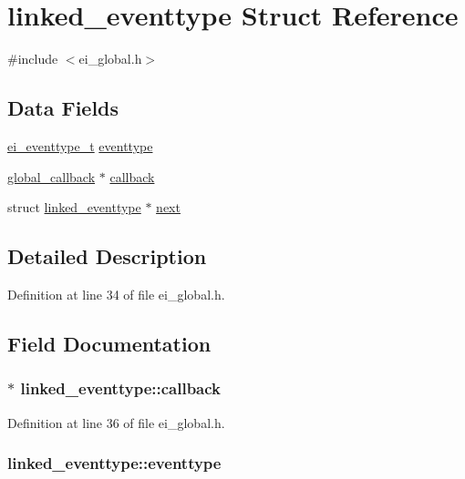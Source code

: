 \hypertarget{structlinked__eventtype}{
\section{linked\_\-eventtype Struct Reference}
\label{structlinked__eventtype}
}


{\ttfamily \#include $<$ei\_\-global.h$>$}\subsection*{Data Fields}
\begin{DoxyCompactItemize}
\item 
\hyperlink{ei__event_8h_a132dde064150d861ad24e9d839cbe007}{ei\_\-eventtype\_\-t} \hyperlink{structlinked__eventtype_a8557063644a1a542f2648834302e7547}{eventtype}
\item 
\hyperlink{structglobal__callback}{global\_\-callback} $\ast$ \hyperlink{structlinked__eventtype_a96eec2ebc0a8d13ce71255393688e138}{callback}
\item 
struct \hyperlink{structlinked__eventtype}{linked\_\-eventtype} $\ast$ \hyperlink{structlinked__eventtype_aaefe49bb1a4cbb8f706e94f565b6d411}{next}
\end{DoxyCompactItemize}


\subsection{Detailed Description}


Definition at line 34 of file ei\_\-global.h.

\subsection{Field Documentation}
\hypertarget{structlinked__eventtype_a96eec2ebc0a8d13ce71255393688e138}{
\subsubsection[{callback}]{$\ast$ {\bf linked\_\-eventtype::callback}}}
\label{structlinked__eventtype_a96eec2ebc0a8d13ce71255393688e138}


Definition at line 36 of file ei\_\-global.h.\hypertarget{structlinked__eventtype_a8557063644a1a542f2648834302e7547}{
\subsubsection[{eventtype}]{ {\bf linked\_\-eventtype::eventtype}}}
\label{structlinked__eventtype_a8557063644a1a542f2648834302e7547}


